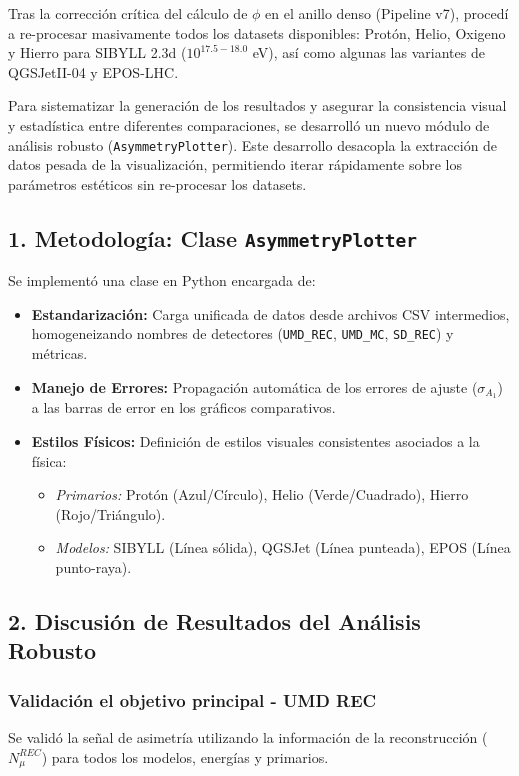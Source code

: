 Tras la corrección crítica del cálculo de $\phi$ en el anillo denso (Pipeline v7), procedí a re-procesar masivamente todos los datasets disponibles: Protón, Helio, Oxigeno y Hierro para SIBYLL 2.3d ($10^{17.5-18.0}$ eV), así como algunas las variantes de QGSJetII-04 y EPOS-LHC.

Para sistematizar la generación de los resultados y asegurar la consistencia visual y estadística entre diferentes comparaciones, se desarrolló un nuevo módulo de análisis robusto (\texttt{AsymmetryPlotter}). Este desarrollo desacopla la extracción de datos pesada de la visualización, permitiendo iterar rápidamente sobre los parámetros estéticos sin re-procesar los datasets.

\subsection*{1. Metodología: Clase \texttt{AsymmetryPlotter}}
Se implementó una clase en Python encargada de:
\begin{itemize}
	\item \textbf{Estandarización:} Carga unificada de datos desde archivos CSV intermedios, homogeneizando nombres de detectores (\texttt{UMD\_REC}, \texttt{UMD\_MC}, \texttt{SD\_REC}) y métricas.
	\item \textbf{Manejo de Errores:} Propagación automática de los errores de ajuste ($\sigma_{A_1}$) a las barras de error en los gráficos comparativos.
	\item \textbf{Estilos Físicos:} Definición de estilos visuales consistentes asociados a la física:
	\begin{itemize}
		\item \textit{Primarios:} Protón (Azul/Círculo), Helio (Verde/Cuadrado), Hierro (Rojo/Triángulo).
		\item \textit{Modelos:} SIBYLL (Línea sólida), QGSJet (Línea punteada), EPOS (Línea punto-raya).
	\end{itemize}
\end{itemize}

\subsection*{2. Discusión de Resultados del Análisis Robusto}

\subsubsection*{Validación el objetivo principal - UMD REC}
Se validó la señal de asimetría utilizando la información de la reconstrucción ($N_{\mu}^{REC}$) para todos los modelos, energías y primarios.

